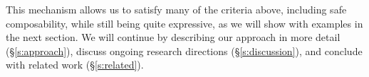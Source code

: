 This mechanism allows us to satisfy many of the criteria above, including safe composability, while still being quite expressive, as we will show with examples in the next section. We will continue by describing our approach in more detail (\S\ref{s:approach}), discuss ongoing research directions (\S\ref{s:discussion}), and conclude with related work (\S\ref{s:related}).





